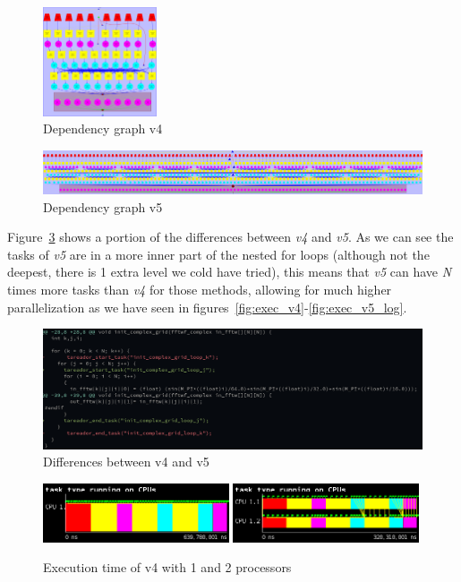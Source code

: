 \begin{figure}[H]%
    \centering
    \includegraphics[width=0.3\textwidth]{data/3dfft_/plots/dependency_graph_v4.png}
    \caption{Dependency graph v4}%
    \label{fig:depen_v4}
\end{figure}
\begin{figure}[H]%
    \centering
    \includegraphics[width=\textwidth]{data/3dfft_/plots/cap.png}
    \caption{Dependency graph v5}%
    \label{fig:depen_v5}
\end{figure}

Figure~\ref{fig:diff} shows a portion of the differences between \emph{v4} and \emph{v5}. As we can see
the tasks of \emph{v5} are in a more inner part of the nested for loops (although not the deepest, there is 1 extra level we cold have tried), this means that \emph{v5} can have \emph{N} times more tasks than \emph{v4} for those methods, allowing for much higher parallelization as we have seen in figures~\ref{fig:exec_v4}-\ref{fig:exec_v5_log}.

\begin{figure}[H]%
    \centering
    \includegraphics[width=\textwidth]{./data/3dfft_/plots/diff.png}
    \caption{Differences between v4 and v5}%
    \label{fig:diff}
\end{figure}

\begin{figure}[H]%
    \label{fig:plot_v4_01}
    \centering
    \includegraphics[width=0.49\textwidth]{./data/3dfft_/plots/v4_01.png}
    \includegraphics[width=0.49\textwidth]{./data/3dfft_/plots/v4_02.png}
    \caption{Execution time of v4 with 1 and 2 processors}%
\end{figure}

